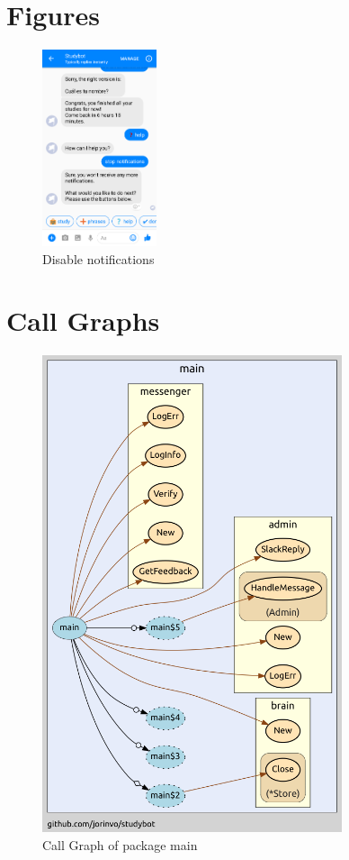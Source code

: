 \chapter{Figures}


\begin{figure}[H]
  \centering
  \includegraphics[width=0.3\textwidth]{images/interface/10-disable-notify.png}
	\caption{Disable notifications}
	\label{fig:10-disable-notify}
\end{figure}


\chapter{Call Graphs}

\begin{figure}[H]
  \centering
  \includegraphics[height=14cm]{images/call-graph-main.png}
	\caption{Call Graph of package main}
  \label{a:call-graph}
\end{figure}

